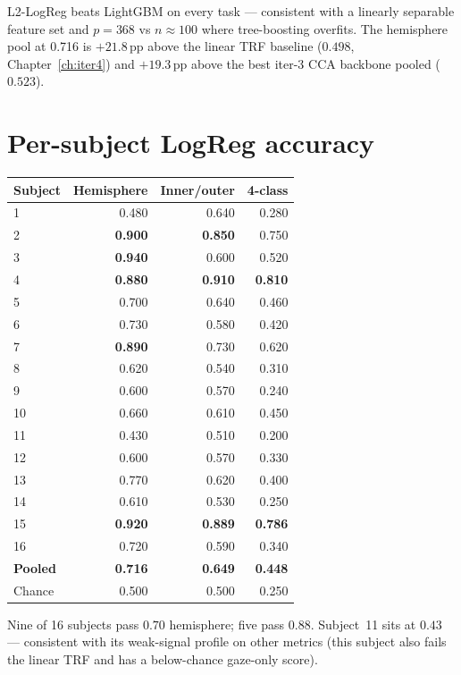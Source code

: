 L2-LogReg beats LightGBM on every task --- consistent with a linearly
separable feature set and $p=368$ vs $n\approx 100$ where tree-boosting
overfits. The hemisphere pool at 0.716 is $+21.8$\,pp above the linear
TRF baseline ($0.498$, Chapter~\ref{ch:iter4}) and $+19.3$\,pp above the
best iter-3 CCA backbone pooled ($0.523$).

\section{Per-subject LogReg accuracy}

\begin{table}[ht]
\centering
\begin{tabular}{lrrr}
\toprule
Subject & Hemisphere & Inner/outer & 4-class \\
\midrule
1  & 0.480 & 0.640 & 0.280 \\
2  & \textbf{0.900} & \textbf{0.850} & 0.750 \\
3  & \textbf{0.940} & 0.600 & 0.520 \\
4  & \textbf{0.880} & \textbf{0.910} & \textbf{0.810} \\
5  & 0.700 & 0.640 & 0.460 \\
6  & 0.730 & 0.580 & 0.420 \\
7  & \textbf{0.890} & 0.730 & 0.620 \\
8  & 0.620 & 0.540 & 0.310 \\
9  & 0.600 & 0.570 & 0.240 \\
10 & 0.660 & 0.610 & 0.450 \\
11 & 0.430 & 0.510 & 0.200 \\
12 & 0.600 & 0.570 & 0.330 \\
13 & 0.770 & 0.620 & 0.400 \\
14 & 0.610 & 0.530 & 0.250 \\
15 & \textbf{0.920} & \textbf{0.889} & \textbf{0.786} \\
16 & 0.720 & 0.590 & 0.340 \\
\midrule
\textbf{Pooled} & \textbf{0.716} & \textbf{0.649} & \textbf{0.448} \\
Chance          & 0.500          & 0.500          & 0.250 \\
\bottomrule
\end{tabular}
\end{table}

Nine of 16 subjects pass $0.70$ hemisphere; five pass $0.88$. Subject~11
sits at $0.43$ --- consistent with its weak-signal profile on other
metrics (this subject also fails the linear TRF and has a below-chance
gaze-only score).

